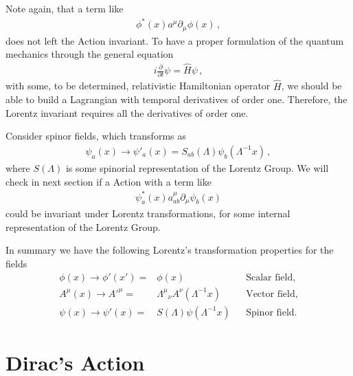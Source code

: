 Note again, that a term like
\begin{align}
\label{eq:nolor}
  \phi^*(x)a^\mu\partial_\mu\phi(x)\,,
\end{align}
does not left the Action invariant. To have a proper formulation of the quantum mechanics through the general equation
\begin{align}
  i\frac{\partial}{\partial t}\psi=\hat{H} \psi\,,  
\end{align}
with some, to be determined, relativistic Hamiltonian operator $\widehat{H}$, we should be able to build a Lagrangian with temporal derivatives of order one. Therefore, the Lorentz invariant requires all the derivatives of order one.  

Consider spinor fields, which transforms as
\begin{align}
\label{eq:184qft}
  \psi_a(x)\to\psi'_a(x)=S_{ab}(\Lambda)\psi_b(\Lambda^{-1}x)\,, 
\end{align}
where $S(\Lambda)$ is some spinorial representation of the Lorentz Group. We will check in next section if a Action with a term like
\begin{align}
  \psi^*_a(x)a^\mu_{ab}\partial_\mu\psi_b(x)
\end{align}
could be invariant under Lorentz transformations, for some internal representation of the Lorentz Group.

In summary we have the following Lorentz's transformation properties for the fields
\begin{align}
   \phi(x)\to \phi'(x')=&\phi(x) && \text{Scalar field,}\nonumber\\
   A^\mu(x)\to {A'}^\mu=&{\Lambda^\mu}_\nu A^\nu(\Lambda^{-1}x)&&\text{Vector field,}\nonumber\\
   \psi(x)\to\psi'(x)=&S(\Lambda)\psi(\Lambda^{-1}x)&&\text{Spinor field.}
\end{align}

\section{Dirac's Action}
\label{sec:dirac-equation}

